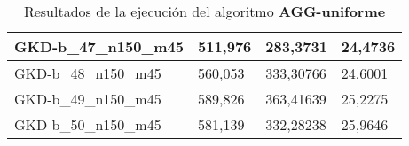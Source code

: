 \begin{table}[!ht]
\begin{adjustbox}{height=12cm}
\begin{tabular}{|l|l|l|l|}
		GKD-b\_47\_n150\_m45 & 511,976 & 283,3731  & 24,4736   \\ \hline
		GKD-b\_48\_n150\_m45 & 560,053 & 333,30766 & 24,6001   \\ \hline
		GKD-b\_49\_n150\_m45 & 589,826 & 363,41639 & 25,2275   \\ \hline
		GKD-b\_50\_n150\_m45 & 581,139 & 332,28238 & 25,9646   \\ \hline
    \end{tabular}
    \end{adjustbox}
    \caption{Resultados de la ejecución del algoritmo \textbf{AGG-uniforme}}
\end{table}

\pagebreak